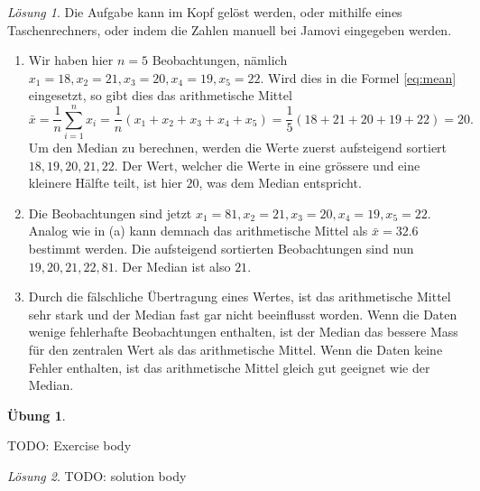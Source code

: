 \documentclass[
]{book}
\providecommand{\tightlist}{%
  \setlength{\itemsep}{0pt}\setlength{\parskip}{0pt}}
\theoremstyle{definition}
\theoremstyle{definition}
\theoremstyle{definition}
\newtheorem{exercise}{Übung}[chapter]
\theoremstyle{definition}
\theoremstyle{remark}
\newtheorem*{solution}{Lösung}
\begin{document}
\begin{solution}

Die Aufgabe kann im Kopf gelöst werden, oder mithilfe eines Taschenrechners, oder indem die Zahlen manuell bei Jamovi eingegeben werden.

\begin{enumerate}
\def\labelenumi{(\alph{enumi})}
\tightlist
\item
  Wir haben hier \(n=5\) Beobachtungen, nämlich \(x_1 = 18, x_2 = 21, x_3 = 20, x_4 = 19, x_5=22\). Wird dies in die Formel \eqref{eq:mean} eingesetzt, so gibt dies das arithmetische Mittel
  \[\bar{x} = \frac{1}{n}\sum^n_{i=1} x_i = \frac{1}{n}(x_1 + x_2 + x_3 + x_4 + x_5) =  \frac{1}{5}(18+ 21+ 20+ 19+ 22) = 20.\]
  Um den Median zu berechnen, werden die Werte zuerst aufsteigend sortiert \(18, 19, 20, 21, 22\). Der Wert, welcher die Werte in eine grössere und eine kleinere Hälfte teilt, ist hier \(20\), was dem Median entspricht.
\item
  Die Beobachtungen sind jetzt \(x_1 = 81, x_2 = 21, x_3 = 20, x_4 = 19, x_5=22\). Analog wie in (a) kann demnach das arithmetische Mittel als \(\bar{x} = 32.6\) bestimmt werden. Die aufsteigend sortierten Beobachtungen sind nun \(19, 20, 21, 22, 81\). Der Median ist also \(21\).
\item
  Durch die fälschliche Übertragung eines Wertes, ist das arithmetische Mittel sehr stark und der Median fast gar nicht beeinflusst worden. Wenn die Daten wenige fehlerhafte Beobachtungen enthalten, ist der Median das bessere Mass für den zentralen Wert als das arithmetische Mittel. Wenn die Daten keine Fehler enthalten, ist das arithmetische Mittel gleich gut geeignet wie der Median.
\end{enumerate}

\end{solution}

\begin{exercise}
\protect\hypertarget{exr:temptag_poiane}{}\label{exr:temptag_poiane}\leavevmode

TODO: Exercise body

\end{exercise}

\begin{solution}
TODO: solution body
\end{solution}
\end{document}
